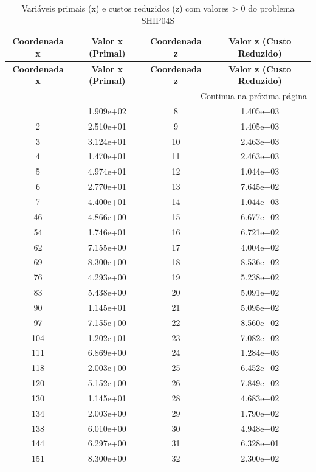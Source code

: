 \documentclass[12pt]{article}
\begin{document}
\begin{longtable}{@{}cccc@{}}
\caption{Variáveis primais (x) e custos reduzidos (z) com valores > 0 do problema SHIP04S} \\
\toprule
\textbf{Coordenada x} & \textbf{Valor x (Primal)} & \textbf{Coordenada z} & \textbf{Valor z (Custo Reduzido)} \\
\midrule
\endfirsthead

\toprule
\textbf{Coordenada x} & \textbf{Valor x (Primal)} & \textbf{Coordenada z} & \textbf{Valor z (Custo Reduzido)} \\
\midrule
\endhead

\midrule \multicolumn{4}{r}{{Continua na próxima página}} \\ \midrule
\endfoot

\bottomrule
\endlastfoot
1 & 1.909e+02 & 8 & 1.405e+03 \\
2 & 2.510e+01 & 9 & 1.405e+03 \\
3 & 3.124e+01 & 10 & 2.463e+03 \\
4 & 1.470e+01 & 11 & 2.463e+03 \\
5 & 4.974e+01 & 12 & 1.044e+03 \\
6 & 2.770e+01 & 13 & 7.645e+02 \\
7 & 4.400e+01 & 14 & 1.044e+03 \\
46 & 4.866e+00 & 15 & 6.677e+02 \\
54 & 1.746e+01 & 16 & 6.721e+02 \\
62 & 7.155e+00 & 17 & 4.004e+02 \\
69 & 8.300e+00 & 18 & 8.536e+02 \\
76 & 4.293e+00 & 19 & 5.238e+02 \\
83 & 5.438e+00 & 20 & 5.091e+02 \\
90 & 1.145e+01 & 21 & 5.095e+02 \\
97 & 7.155e+00 & 22 & 8.560e+02 \\
104 & 1.202e+01 & 23 & 7.082e+02 \\
111 & 6.869e+00 & 24 & 1.284e+03 \\
118 & 2.003e+00 & 25 & 6.452e+02 \\
120 & 5.152e+00 & 26 & 7.849e+02 \\
130 & 1.145e+01 & 28 & 4.683e+02 \\
134 & 2.003e+00 & 29 & 1.790e+02 \\
138 & 6.010e+00 & 30 & 4.948e+02 \\
144 & 6.297e+00 & 31 & 6.328e+01 \\
151 & 8.300e+00 & 32 & 2.300e+02 \\

\end{longtable}
\end{document}
